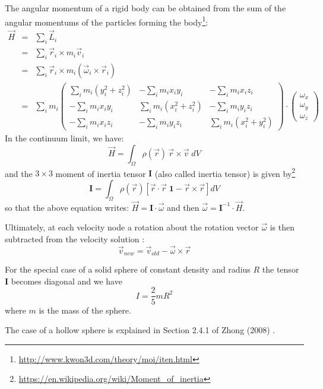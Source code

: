 The angular momentum of a rigid body can be obtained from the sum 
of the angular momentums of the particles forming the 
body\footnote{\url{http://www.kwon3d.com/theory/moi/iten.html}}:
\begin{eqnarray}
\vec H 
&=& \sum_i \vec L_i\\
&=& \sum_i \vec r_i \times m_i \vec v_i\\
&=& \sum_i \vec r_i \times m_i (\vec \omega_i \times \vec r_i)\\
&=& \sum_i m_i 
\left(
\begin{array}{ccc}
\sum_i m_i(y_i^2+z_i^2) & -\sum_i m_i x_iy_i & -\sum_i m_i x_i z_i \\
-\sum_i m_i x_iy_i & \sum_i m_i(x_i^2+z_i^2) & -\sum_i m_i y_i z_i \\
-\sum_i m_i x_i z_i & -\sum_i m_i y_i z_i & \sum_i m_i(x_i^2+y_i^2)
\end{array}
\right)
\cdot
\left(
\begin{array}{c}
\omega_x \\ \omega_y \\ \omega_z
\end{array}
\right)
\end{eqnarray}
In the continuum limit, we have:
\begin{equation}
{\vec H} = \int_\Omega \rho(\vec r) \, {\vec r} \times {\vec v}\; dV
\end{equation}
and the $3\times3$ moment of inertia tensor $\bm I$
(also called inertia tensor) is given by\footnote{\url{https://en.wikipedia.org/wiki/Moment\_of\_inertia}}
\begin{equation}
{\bm I}= 
\int_\Omega \rho(\vec r) [\vec r\cdot\vec r \; \bm 1 - \vec r \times \vec r  ] dV
\end{equation}
so that the above equation writes:
$
{\vec H}={\bm I}\cdot {\vec \omega}
$
and then ${\vec \omega}={\bm I}^{-1} \cdot {\vec H}$.

Ultimately, at each velocity node a rotation about the rotation 
vector ${\vec \omega}$ is then subtracted from the velocity 
solution \cite[eq. 26]{zhmt08}:
\begin{equation}
\vec v_{new} = \vec v_{old} - \vec \omega \times \vec r 
\end{equation}

For the special case of a solid sphere of constant density
and radius $R$ the tensor ${\bm I}$ becomes diagonal
and we have 
\[
I=\frac{2}{5}m R^2
\]
where $m$ is the mass of the sphere. 

The case of a hollow sphere is explained in Section 2.4.1 of Zhong \etal (2008) \cite{zhmt08}. 

